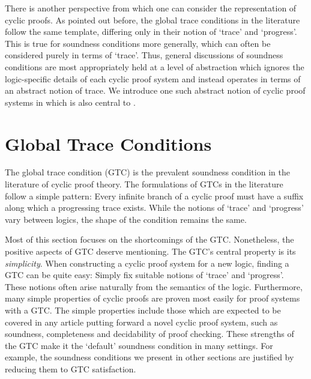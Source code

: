 There is another perspective from which one can consider the representation of
cyclic proofs. As pointed out before, the global trace conditions in the
literature follow the same template, differing only in their notion of
`trace' and `progress'. This is true for soundness conditions more generally,
which can often be considered purely in terms of `trace'. Thus,
general discussions of soundness conditions are most
appropriately held at a level of abstraction which ignores the logic-specific
details of each cyclic proof system and instead operates in terms of an abstract
notion of trace. We introduce one such abstract notion of cyclic proof systems
in  which is also central to \papOne{}.

\section{Global Trace Conditions}
\label{sec:gtcs}

The global trace condition (GTC) is the prevalent soundness condition in the
literature of cyclic proof theory.
The formulations of GTCs in the
literature follow a simple pattern: Every infinite branch of a cyclic proof must
have a suffix along which a progressing trace exists. While the notions of `trace'
and `progress' vary between logics, the shape of the condition remains the same.

Most of this section focuses on the shortcomings of the GTC.
Nonetheless, the positive aspects of GTC
deserve mentioning. The GTC's central property is its \emph{simplicity}. When
constructing a cyclic proof system for a new logic, finding a GTC can
be quite easy: Simply fix suitable notions of `trace' and `progress'. These
notions often arise naturally from the semantics of the logic. Furthermore, many
simple properties of cyclic proofs are proven most easily for proof systems
with a GTC. The simple properties include those which are expected to be covered
in any article putting forward a novel cyclic proof system, such as soundness,
completeness and decidability of proof checking.
These strengths of the GTC make it the `default' soundness condition in many
settings. For example, the soundness conditions we present in other sections are
justified by reducing them to GTC satisfaction.

